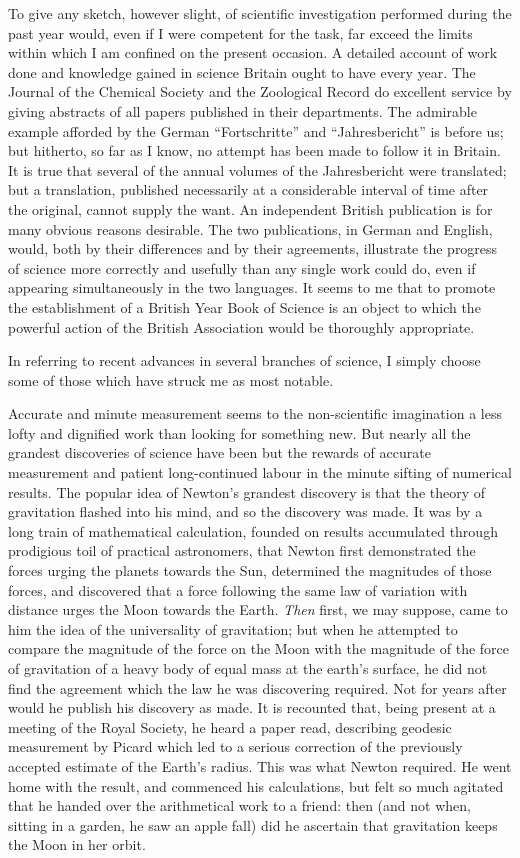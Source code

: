 \documentclass[a4paper, 11pt, oneside, english]{article}
\begin{document}
To give any sketch, however slight, of scientific investigation performed during the past year would, even if I were competent for the task, far exceed the limits within which I am confined on the present occasion. A detailed account of work done and knowledge gained in science Britain ought to have every year. The Journal of the Chemical Society and the Zoological Record do excellent service by giving abstracts of all papers published in their departments. The admirable example afforded by the German ``Fortschritte'' and ``Jahresbericht'' is before us; but hitherto, so far as I know, no attempt has been made to follow it in Britain. It is true that several of the annual volumes of the Jahresbericht were translated; but a translation, published necessarily at a considerable interval of time after the original, cannot supply the want. An independent British publication is for many obvious reasons desirable. The two publications, in German and English, would, both by their differences and by their agreements, illustrate the progress of science more correctly and usefully than any single work could do, even if appearing simultaneously in the two languages. It seems to me that to promote the establishment of a British Year Book of Science is an object to which the powerful action of the British Association would be thoroughly appropriate.

In referring to recent advances in several branches of science, I simply choose some of those which have struck me as most notable.

Accurate and minute measurement seems to the non-scientific imagination a less lofty and dignified work than looking for something new. But nearly all the grandest discoveries of science have been but the rewards of accurate measurement and patient long-continued labour in the minute sifting of numerical results. The popular idea of Newton's grandest discovery is that the theory of gravitation flashed into his mind, and so the discovery was made. It was by a long train of mathematical calculation, founded on results accumulated through prodigious toil of practical astronomers, that Newton first demonstrated the forces urging the planets towards the Sun, determined the magnitudes of those forces, and discovered that a force following the same law of variation with distance urges the Moon towards the Earth. \emph{Then} first, we may suppose, came to him the idea of the universality of gravitation; but when he attempted to compare the magnitude of the force on the Moon with the magnitude of the force of gravitation of a heavy body of equal mass at the earth's surface, he did not find the agreement which the law he was discovering required. Not for years after would he publish his discovery as made. It is recounted that, being present at a meeting of the Royal Society, he heard a paper read, describing geodesic measurement by Picard which led to a serious correction of the previously accepted estimate of the Earth's radius. This was what Newton required. He went home with the result, and commenced his calculations, but felt so much agitated that he handed over the arithmetical work to a friend: then (and not when, sitting in a garden, he saw an apple fall) did he ascertain that gravitation keeps the Moon in her orbit.
\end{document}

